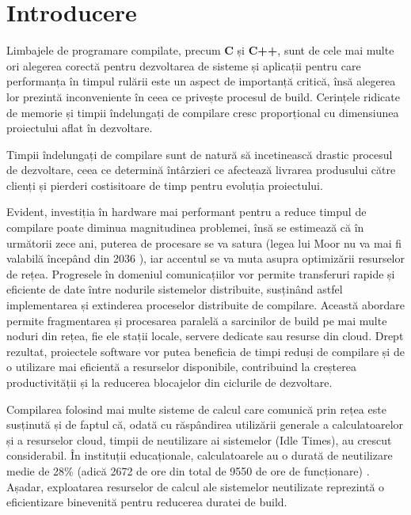 

\chapter{Introducere}

Limbajele de programare compilate, precum \textbf{C} și \textbf{C++}, sunt de cele mai multe ori
alegerea corectă pentru dezvoltarea de sisteme și aplicații pentru care performanța în timpul
rulării este un aspect de importanță critică, însă alegerea lor prezintă inconveniente în ceea ce
privește procesul de build. Cerințele ridicate de memorie și timpii îndelungați de compilare cresc
proporțional cu dimensiunea proiectului aflat în dezvoltare.

Timpii îndelungați de compilare sunt de natură să incetinească drastic procesul de dezvoltare, ceea
ce determină întârzieri ce afectează livrarea produsului către clienți și pierderi costisitoare de
timp pentru evoluția proiectului.

Evident, investiția în hardware mai performant pentru a reduce timpul de compilare poate diminua
magnitudinea problemei, însă se estimează că în următorii zece ani, puterea de procesare se va satura
(legea lui Moor nu va mai fi valabilă începând din 2036 \cite{powell2008quantum}), iar accentul se 
va muta asupra optimizării resurselor de rețea. Progresele în domeniul comunicațiilor vor permite
transferuri rapide și eficiente de date între nodurile sistemelor distribuite, susținând astfel 
implementarea și extinderea proceselor distribuite de compilare. Această abordare permite
fragmentarea și procesarea paralelă a sarcinilor de build pe mai multe noduri din rețea, fie ele stații locale, servere dedicate sau resurse din cloud. Drept rezultat, proiectele software vor putea beneficia de timpi reduși de compilare și de o utilizare mai eficientă a resurselor disponibile, contribuind la creșterea productivității și la reducerea blocajelor din ciclurile de dezvoltare.

Compilarea folosind mai multe sisteme de calcul care comunică prin rețea este susținută și de faptul
că, odată cu răspândirea utilizării generale a calculatoarelor și a resurselor cloud, timpii de
neutilizare ai sistemelor (Idle Times), au crescut considerabil. În instituții educaționale, calculatoarele au o durată de neutilizare medie de 28\% (adică 2672 de ore din total de 9550 de 
ore de funcționare) \cite{kondo2009cost}. Așadar, exploatarea resurselor de calcul ale sistemelor
neutilizate reprezintă o eficientizare binevenită pentru reducerea duratei de build.

